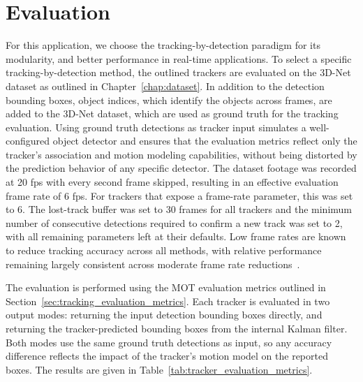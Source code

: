 \documentclass[12pt,oneside,bibtotoc,liststotoc]{scrbook}
\begin{document}
\vspace{-2em}
\section{Evaluation}
\vspace{-0.5em}

For this application, we choose the tracking-by-detection paradigm for its modularity, and
better performance in real-time applications. To select a specific tracking-by-detection method,
the outlined trackers are evaluated on the 3D-Net dataset as outlined in Chapter~\ref{chap:dataset}.
In addition to the detection bounding boxes, object indices, which identify the objects across frames,
are added to the 3D-Net dataset, which are used as ground truth for the tracking evaluation.
Using ground truth detections as tracker input simulates a well-configured object detector and
ensures that the evaluation metrics reflect only the tracker's association and motion modeling
capabilities, without being distorted by the prediction behavior of any specific detector.
The dataset footage was recorded at 20 fps with every second frame skipped, resulting in an
effective evaluation frame rate of 6 fps. For trackers that expose a frame-rate parameter, this
was set to 6. The lost-track buffer was set to 30 frames for all trackers and the minimum number
of consecutive detections required to confirm a new track was set to 2, with all remaining
parameters left at their defaults.
Low frame rates are known to reduce tracking accuracy across all methods, with relative performance
remaining largely consistent across moderate frame rate reductions~\cite{mabrouk2022assessment}.

The evaluation is performed using the MOT evaluation metrics outlined in
Section~\ref{sec:tracking_evaluation_metrics}. Each tracker is evaluated in two output modes:
returning the input detection bounding boxes directly, and returning the tracker-predicted
bounding boxes from the internal Kalman filter. Both modes use the same ground truth detections
as input, so any accuracy difference reflects the impact of the tracker's motion model on the
reported boxes. The results are given in Table~\ref{tab:tracker_evaluation_metrics}.
\end{document}
